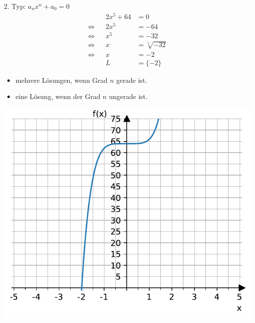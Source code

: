 \documentclass[
  ignorenonframetext,
  aspectratio=169,
]{beamer}
\providecommand{\tightlist}{%
  \setlength{\itemsep}{0pt}\setlength{\parskip}{0pt}}\usepackage{longtable,booktabs,array}
\begin{document}
\begin{frame}
\begin{block}{2. Typ: \(a_n x^n+ a_0=0\)}
\label{typ-a_n-xn-a_00}
\[ \begin{aligned}
&& 2x^5+64 &= 0\\
\Leftrightarrow && 2x^5 &= -64\\
\Leftrightarrow && x^5 &= -32\\
\Leftrightarrow && x &= \sqrt[5]{-32}\\
\Leftrightarrow && x &= -2\\
&& L&=\{-2\}
\end{aligned}
\]

\begin{itemize}
\tightlist
\item
  mehrere Lösungen, wenn Grad \(n\) gerade ist.
\item
  eine Lösung, wenn der Grad \(n\) ungerade ist.
\end{itemize}
\end{block}
\end{frame}

\begin{frame}
\includegraphics{3_Gleichungen_files/figure-beamer/cell-3-output-1.pdf}
\end{frame}
\end{document}
